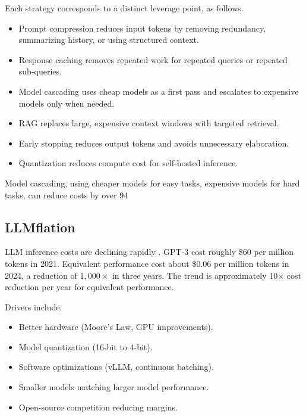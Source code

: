 Each strategy corresponds to a distinct leverage point, as follows.

\begin{itemize}
\item Prompt compression reduces input tokens by removing redundancy, summarizing history, or using structured context.
\item Response caching removes repeated work for repeated queries or repeated sub-queries.
\item Model cascading uses cheap models as a first pass and escalates to expensive models only when needed.
\item RAG replaces large, expensive context windows with targeted retrieval.
\item Early stopping reduces output tokens and avoids unnecessary elaboration.
\item Quantization reduces compute cost for self-hosted inference.
\end{itemize}

Model cascading, using cheaper models for easy tasks, expensive models for hard tasks, can reduce costs by over 94%

\subsection{LLMflation}

LLM inference costs are declining rapidly \cite{llmflation2024}. GPT-3 cost roughly \$60 per million tokens in 2021. Equivalent performance cost about \$0.06 per million tokens in 2024, a reduction of $1{,}000\times$ in three years. The trend is approximately 10$\times$ cost reduction per year for equivalent performance.

Drivers include.
\begin{itemize}
\item Better hardware (Moore’s Law, GPU improvements).
\item Model quantization (16-bit to 4-bit).
\item Software optimizations (vLLM, continuous batching).
\item Smaller models matching larger model performance.
\item Open-source competition reducing margins.
\end{itemize}

